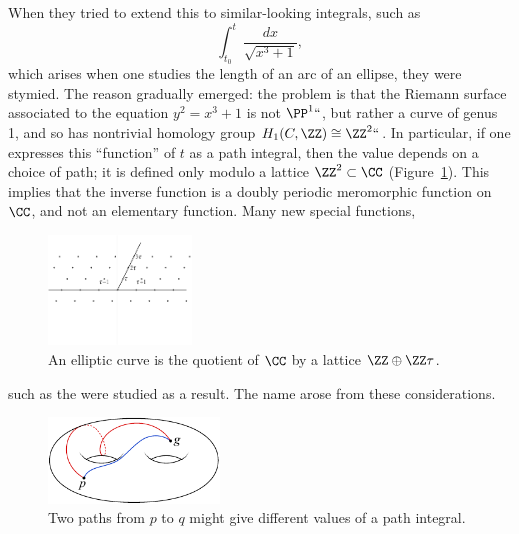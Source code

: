 When they tried to extend this to similar-looking integrals, such as
$$
\int_{t_0}^t \frac{dx}{\sqrt{x^3+1}},
$$
which arises when one studies the length of an arc of an ellipse, they
%
%
were stymied. The reason gradually emerged: the problem is that the
Riemann surface associated to the equation $y^2 = x^3+1$ is not
$\PP^1` `$, but rather a curve of genus 1, and so has nontrivial
homology group $H_1(C, \ZZ) \cong \ZZ^2` `$. In particular, if one
expresses this ``function'' of $t$  as a path integral, then the value
\vadjust{\goodbreak}%
depends on a choice of path; it is defined only modulo a lattice
$\ZZ^2 \subset \CC$ (Figure~\ref{a lattice}). This implies
that the inverse function is a doubly periodic 
%
meromorphic function
on
$\CC$, and not an elementary function. Many new special functions,
%
\begin{figure}
\centerline{\includegraphics[height=1.15in,trim=0 40 0 12,clip]{"main/Fig04-2"}}
\vskip-6pt
\caption{An elliptic curve is the quotient of $\CC$ by a lattice $\ZZ\oplus \ZZ\tau$.}
\label{a lattice}
%
\end{figure}
%
such as the 
%
%
%
were studied as a result. The name 
%
arose from these considerations. 

\begin{figure}[b]
\vskip3pt
\includegraphics[height=0.9in]{"main/Fig04-1"}
\vskip-3pt
\caption{Two paths from $p$ to $q$ might give different values of a path integral.}
\label{dependence on path}
\end{figure}

